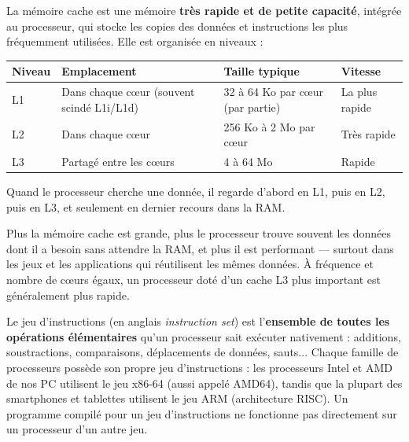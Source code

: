 \documentclass[11pt]{article}
\newcommand{\cle}[1]{{\popxbold\color{popdark}#1}}
\newcounter{popsec}
\newcounter{popsub}
\newcommand{\courssub}[1]{%
  \stepcounter{popsub}%
  \par\vspace{9pt}\noindent{\popxbold\fontsize{11.5}{13}\selectfont\color{popink}{\color{poporange}\thepopsec.\thepopsub}\hspace{6pt}#1}\par\nopagebreak\vspace{4pt}
}
\begin{document}
\begin{definition}
La \cle{mémoire cache} est une mémoire \textbf{très rapide et de petite capacité}, intégrée au processeur, qui stocke les copies des données et instructions les plus fréquemment utilisées. Elle est organisée en \cle{niveaux} :
\begin{center}
\begin{tabularx}{\linewidth}{|l|X|X|X|}
\hline
\rowcolor{popblueL} \textbf{Niveau} & \textbf{Emplacement} & \textbf{Taille typique} & \textbf{Vitesse} \\
\hline
\cle{L1} & Dans chaque cœur (souvent scindé L1i/L1d) & 32 à 64 Ko par cœur (par partie) & La plus rapide \\
\hline
\cle{L2} & Dans chaque cœur & 256 Ko à 2 Mo par cœur & Très rapide \\
\hline
\cle{L3} & Partagé entre les cœurs & 4 à 64 Mo & Rapide \\
\hline
\end{tabularx}
\end{center}
Quand le processeur cherche une donnée, il regarde d'abord en L1, puis en L2, puis en L3, et seulement en dernier recours dans la RAM.
\end{definition}

\begin{propriete}
Plus la mémoire cache est grande, plus le processeur trouve souvent les données dont il a besoin sans attendre la RAM, et plus il est performant — surtout dans les jeux et les applications qui réutilisent les mêmes données. À fréquence et nombre de cœurs égaux, un processeur doté d'un cache L3 plus important est généralement plus rapide.
\end{propriete}

\courssub{Le jeu d'instructions}

\begin{definition}
Le \cle{jeu d'instructions} (en anglais \emph{instruction set}) est l'\textbf{ensemble de toutes les opérations élémentaires} qu'un processeur sait exécuter nativement : additions, soustractions, comparaisons, déplacements de données, sauts... Chaque famille de processeurs possède son propre jeu d'instructions : les processeurs Intel et AMD de nos PC utilisent le jeu \cle{x86-64} (aussi appelé AMD64), tandis que la plupart des smartphones et tablettes utilisent le jeu \cle{ARM} (architecture RISC). Un programme compilé pour un jeu d'instructions ne fonctionne pas directement sur un processeur d'un autre jeu.
\end{definition}
\end{document}
